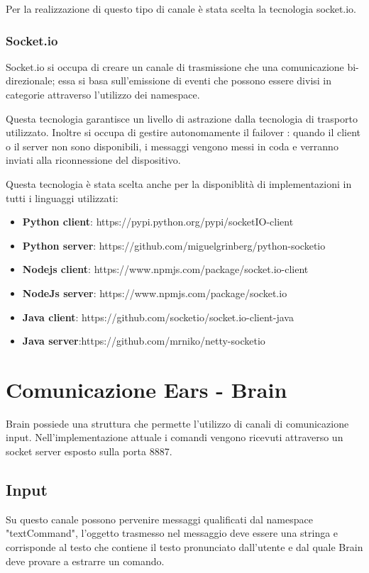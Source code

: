 \documentclass[twoside]{supsistudent}
\begin{document}
Per la realizzazione di questo tipo di canale è stata scelta la tecnologia socket.io. 
\subsection{Socket.io}
Socket.io si occupa di creare un canale di trasmissione che una comunicazione bi-direzionale; essa si basa sull'emissione di eventi che possono essere divisi in categorie attraverso l'utilizzo dei namespace.

Questa tecnologia garantisce un livello di astrazione dalla tecnologia di trasporto utilizzato. Inoltre si occupa di gestire autonomamente il failover : quando il client o il server non sono disponibili, i messaggi vengono messi in coda e verranno inviati alla riconnessione del dispositivo.

Questa tecnologia è stata scelta anche per la disponiblità di implementazioni in tutti i linguaggi utilizzati:
\begin{itemize}
	\item \textbf{Python client}: https://pypi.python.org/pypi/socketIO-client
	\item \textbf{Python server}: https://github.com/miguelgrinberg/python-socketio
	\item \textbf{Nodejs client}: https://www.npmjs.com/package/socket.io-client
	\item \textbf{NodeJs server}: https://www.npmjs.com/package/socket.io
	\item \textbf{Java client}: https://github.com/socketio/socket.io-client-java
	\item \textbf{Java server}:https://github.com/mrniko/netty-socketio
\end{itemize}

\chapter{Comunicazione Ears - Brain }
Brain possiede una struttura che permette l'utilizzo di canali di comunicazione input. Nell'implementazione attuale i comandi vengono ricevuti attraverso un socket server esposto sulla porta 8887.
\section{Input}
Su questo canale possono pervenire messaggi qualificati dal namespace "textCommand", l'oggetto trasmesso nel messaggio deve essere una stringa e corrisponde al testo che contiene il testo pronunciato dall'utente e dal quale Brain deve provare a estrarre un comando.
\end{document}

